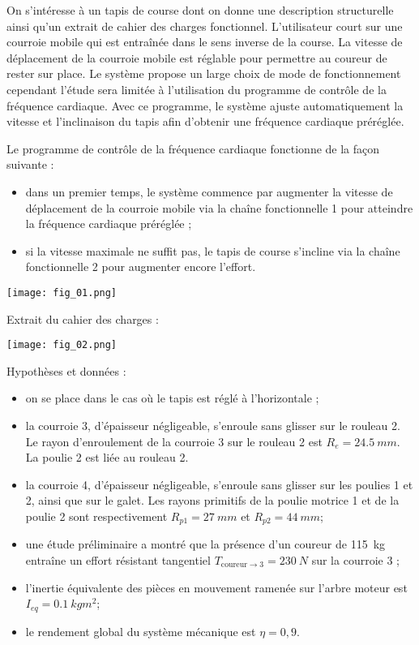 \ifprof
\else
\begin{multicols}{2}
\fi
On s’intéresse à un tapis de course dont on
donne une description structurelle ainsi qu’un
extrait de cahier des charges fonctionnel.
L’utilisateur court sur une courroie mobile qui
est entraînée dans le sens inverse de la course.
La vitesse de déplacement de la courroie mobile
est réglable pour permettre au coureur de rester
sur place.
Le système propose un large choix de mode de
fonctionnement cependant l’étude sera limitée
à l’utilisation du programme de contrôle de la
fréquence cardiaque.
Avec ce programme, le système ajuste
automatiquement la vitesse et l’inclinaison du
tapis afin d’obtenir une fréquence cardiaque
préréglée.

Le programme de contrôle de la fréquence cardiaque fonctionne de la façon suivante :
\begin{itemize}
\item dans un premier temps, le système commence par augmenter la vitesse de déplacement de la courroie
mobile via la chaîne fonctionnelle 1 pour atteindre la fréquence cardiaque préréglée ;
\item si la vitesse maximale ne suffit pas, le tapis de course s’incline via la chaîne fonctionnelle 2 pour
augmenter encore l’effort.
\end{itemize}

\begin{center}
\texttt{[image: fig\_01.png]}
\end{center}

Extrait du cahier des charges :

\begin{center}
\texttt{[image: fig\_02.png]}
\end{center}

Hypothèses et données :
\begin{itemize}
\item on se place dans le cas où le tapis est réglé à l’horizontale ;
\item la courroie 3, d’épaisseur négligeable, s’enroule sans glisser sur le rouleau 2. Le rayon d’enroulement
de la courroie 3 sur le rouleau 2 est $R_e=\SI{24,5}{mm}$. La poulie 2 est liée au rouleau 2.
\item la courroie 4, d’épaisseur négligeable, s’enroule sans glisser sur les poulies 1 et 2, ainsi que sur le galet.
Les rayons primitifs de la poulie motrice 1 et de la poulie 2 sont respectivement $R_{p1}=\SI{27}{mm}$ et
$R_{p2}=\SI{44}{mm}$;
\item une étude préliminaire a montré que la présence d’un coureur de \SI{115}{kg} entraîne un effort résistant
tangentiel $T_{\text{coureur}\to 3}=\SI{230}{N}$ sur la courroie 3 ;
\item l’inertie équivalente des pièces en mouvement ramenée sur l’arbre moteur est $I_{eq}=\SI{0,1}{kg m^2}$;
\item le rendement global du système mécanique est $\eta=0,9$.
\end{itemize}



\end{multicols}
